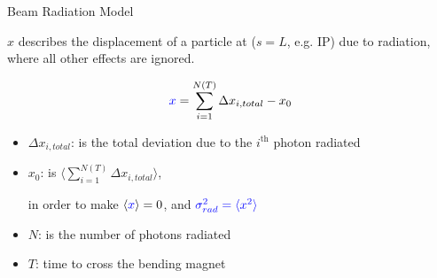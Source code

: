 \documentclass{beamer}
\begin{document}
\begin{frame}{Beam Radiation Model}

{\color{blue}$x$} describes the displacement of a particle at ($s=L$, e.g. IP) due to radiation, where
 all other effects are ignored.
 
 \begin{equation}
{\color{blue} x} = \sum_{i=1}^{N(T)}\Delta x_{i,total} - x_0
\end{equation}
\begin{itemize}
 \item $\Delta x_{i,total} $: is the total deviation due to the $i^{\text{th}}$ photon radiated
 \item $x_0$: is $\langle\sum_{i=1}^{N(T)}\Delta x_{i,total}\rangle$, \par \hspace*{1cm}in order to make $\langle {\color{blue}x}\rangle=0$,
 and ${\color{blue} \sigma_{rad}^2=\langle x^2\rangle}$
 \item $N$: is the number of photons radiated
 \item $T$: time to cross the bending magnet
\end{itemize}
\end{frame}
% 
% 
% 
\end{document}
